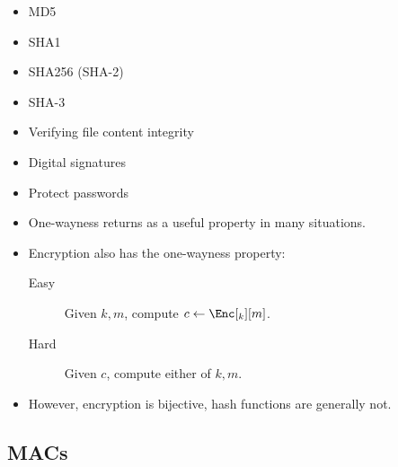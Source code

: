 \begin{frame}
  \begin{example}
    \begin{itemize}
      \item MD5
      \item SHA1
      \item SHA256 (SHA-2)
      \item SHA-3
    \end{itemize}
  \end{example}
  \begin{example}[Applications]
    \begin{itemize}
      \item Verifying file content integrity
      \item Digital signatures
      \item Protect passwords
    \end{itemize}
  \end{example}
\end{frame}

\begin{frame}
  \begin{remark}
    \begin{itemize}
      \item One-wayness returns as a useful property in many situations.
      \item Encryption also has the one-wayness property:
        \begin{description}
          \item[Easy] Given \(k, m\), compute \(c\gets \Enc[_k][m]\).
          \item[Hard] Given \(c\), compute either of \(k, m\).
        \end{description}
      \item However, encryption is bijective, hash functions are generally not.
    \end{itemize}
  \end{remark}
\end{frame}

\subsection{\Aclp{MAC}}

